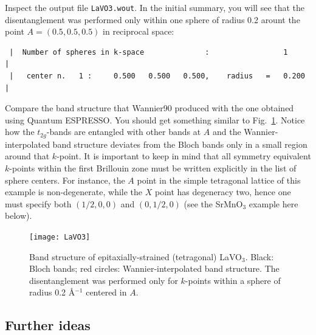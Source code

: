 \documentclass[a4paper,11pt,twoside]{article}
\begin{document}
Inspect the output file {\tt LaVO3.wout}. In the initial summary, you
will see that the disentanglement was performed only within one sphere
of radius 0.2 arount the point $A=(0.5, 0.5, 0.5)$ in reciprocal space:
\begin{verbatim}
 |  Number of spheres in k-space              :                 1             |
 |   center n.   1 :     0.500   0.500   0.500,    radius   =   0.200         |
\end{verbatim}

Compare the band structure that Wannier90 produced with the one
obtained using Quantum ESPRESSO. You should get something similar to Fig.~\ref{fig:lavo3}.
Notice how the $t_{2g}$-bands are entangled with other bands at $A$ and the Wannier-interpolated band structure deviates from the Bloch bands only in a small region around that $k$-point.
It is important to keep in mind that all symmetry equivalent $k$-points within the first Brillouin zone must be written explicitly in the list of sphere centers. 
For instance, the $A$ point in the simple tetragonal lattice of this example is non-degenerate, while the $X$ point has degeneracy two, hence one must specify both $(1/2,0,0)$ and $(0,1/2,0)$ (see the SrMnO$_3$ example here below).

\begin{figure}[h]
\begin{center}
\texttt{[image: LaVO3]}
\caption{Band structure of epitaxially-strained (tetragonal) LaVO$_3$. Black: Bloch bands; red circles: Wannier-interpolated band structure. The disentanglement was performed only for $k$-points within a sphere of radius 0.2 \AA$^{-1}$ centered in $A$.} 
\label{fig:lavo3}
\end{center}
\end{figure}

\subsection*{Further ideas}
\end{document}
